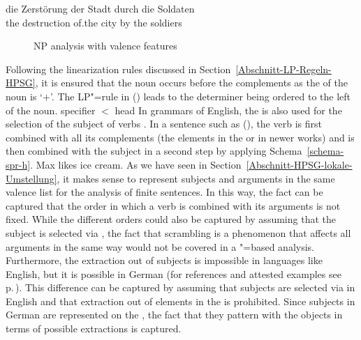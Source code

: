 \ea
\gll die Zerstörung der Stadt durch die Soldaten\\
	 the destruction of.the city by the soldiers\\
\z
\begin{figure}
\caption{NP analysis with valence features \spr}\label{Abbildung-die-Zerstorung} 
\end{figure}%
Following the linearization rules discussed in Section~\ref{Abschnitt-LP-Regeln-HPSG}, it is ensured that the noun occurs before the complements as the
\initialv of the noun is `$+$'. The LP"=rule in () leads to the determiner being ordered to the left of the noun.
\ea
specifier $<$ head
\z
%
%
In grammars of English, the \sprf is also used for the selection of the subject of verbs \citep*[Section~4.3]{SWB2003a}.
In a sentence such as (), the verb is first combined with all its complements (the elements in the \subcat or
\comps in newer works) and is then combined with the subject in a second step by applying Schema~\ref{schema-spr-h}.
\ea
Max likes ice cream.
\z
As we have seen in Section~\ref{Abschnitt-HPSG-lokale-Umstellung}, it makes sense to represent subjects and arguments in the same valence list
for the analysis of finite sentences. In this way, the fact can be captured that the order in which a verb is combined with its arguments is not
fixed. While the different orders could also be captured by assuming that the subject is selected
via \spr, the fact that scrambling is a phenomenon that affects all arguments in the same way would
not be covered in a \spr"=based analysis. Furthermore, the extraction out of subjects is impossible
in languages like English, but it is possible in German (for references and attested examples see p.\,\pageref{page-extraction-out-of-subjects}). This difference can be captured by assuming
that subjects are selected via \spr in English and that extraction out of elements in the \sprl is
prohibited. Since subjects in German are represented on the \compsl, the fact that they pattern with
the objects in terms of possible extractions is captured.

